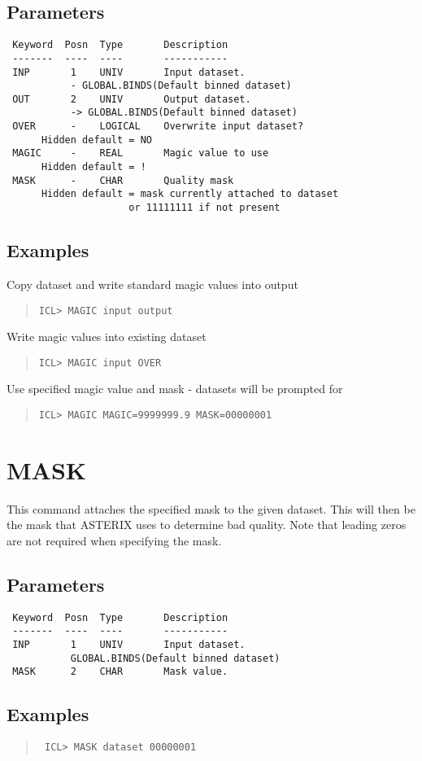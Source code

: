 \documentclass{book}
\renewcommand{\_}{{\tt\char'137}}     %
\begin{document}
\subsection{Parameters}
\begin{verbatim}
 Keyword  Posn  Type       Description
 -------  ----  ----       -----------
 INP       1    UNIV       Input dataset.
           - GLOBAL.BINDS(Default binned dataset)
 OUT       2    UNIV       Output dataset.
           -> GLOBAL.BINDS(Default binned dataset)
 OVER      -    LOGICAL    Overwrite input dataset?
      Hidden default = NO
 MAGIC     -    REAL       Magic value to use
      Hidden default = !
 MASK      -    CHAR       Quality mask
      Hidden default = mask currently attached to dataset
                     or 11111111 if not present

\end{verbatim}\subsection{Examples}
Copy dataset and write standard magic values into output
\begin{quote}\begin{verbatim}
ICL> MAGIC input output
\end{verbatim}\end{quote}
Write magic values into existing dataset
\begin{quote}\begin{verbatim}
ICL> MAGIC input OVER
\end{verbatim}\end{quote}
Use specified magic value and mask - datasets will be prompted for
\begin{quote}\begin{verbatim}
ICL> MAGIC MAGIC=9999999.9 MASK=00000001
\end{verbatim}\end{quote}
\section{MASK}
This command attaches the specified mask to the given dataset. This
will then be the mask that ASTERIX uses to determine bad quality.
Note that leading zeros are not required when specifying the mask.

\subsection{Parameters}
\begin{verbatim}
 Keyword  Posn  Type       Description
 -------  ----  ----       -----------
 INP       1    UNIV       Input dataset.
           GLOBAL.BINDS(Default binned dataset)
 MASK      2    CHAR       Mask value.

\end{verbatim}\subsection{Examples}
\begin{quote}\begin{verbatim}
 ICL> MASK dataset 00000001
\end{verbatim}\end{quote}
\end{document}
